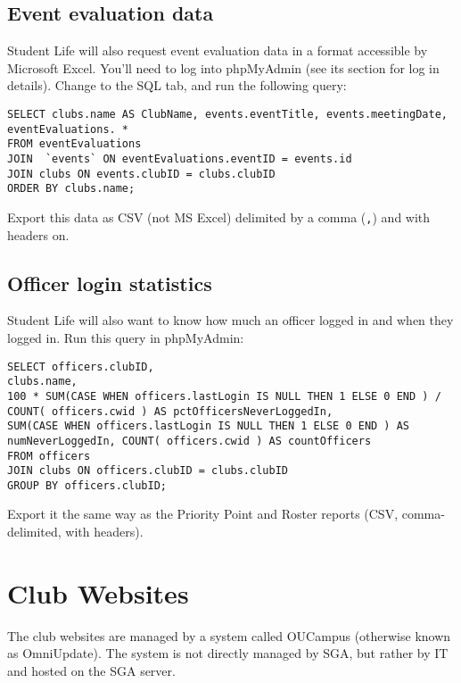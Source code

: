 \documentclass[11pt]{report}
\begin{document}
		\subsection{Event evaluation data}
			Student Life will also request event evaluation data in a format accessible by Microsoft Excel. You'll need to log into phpMyAdmin (see its section for log in details). Change to the SQL tab, and run the following query:
			
			\hfill
			
			\begin{lstlisting}
SELECT clubs.name AS ClubName, events.eventTitle, events.meetingDate, eventEvaluations. *
FROM eventEvaluations
JOIN  `events` ON eventEvaluations.eventID = events.id
JOIN clubs ON events.clubID = clubs.clubID
ORDER BY clubs.name;	
			\end{lstlisting}
			
			\hfill
			
			Export this data as CSV (not MS Excel) delimited by a comma (\texttt{,}) and with headers on.
			
		\subsection{Officer login statistics}
			Student Life will also want to know how much an officer logged in and when they logged in. Run this query in phpMyAdmin:
			
			\hfill
			
			\begin{lstlisting}
SELECT officers.clubID,
clubs.name,
100 * SUM(CASE WHEN officers.lastLogin IS NULL THEN 1 ELSE 0 END ) / COUNT( officers.cwid ) AS pctOfficersNeverLoggedIn,
SUM(CASE WHEN officers.lastLogin IS NULL THEN 1 ELSE 0 END ) AS numNeverLoggedIn, COUNT( officers.cwid ) AS countOfficers
FROM officers
JOIN clubs ON officers.clubID = clubs.clubID
GROUP BY officers.clubID;	
			\end{lstlisting}
			
			\hfill
			
			Export it the same way as the Priority Point and Roster reports (CSV, comma-delimited, with headers).

			
	\section{Club Websites}
		The club websites are managed by a system called OUCampus (otherwise known as OmniUpdate). The system is not directly managed by SGA, but rather by IT and hosted on the SGA server.
		
\end{document}
